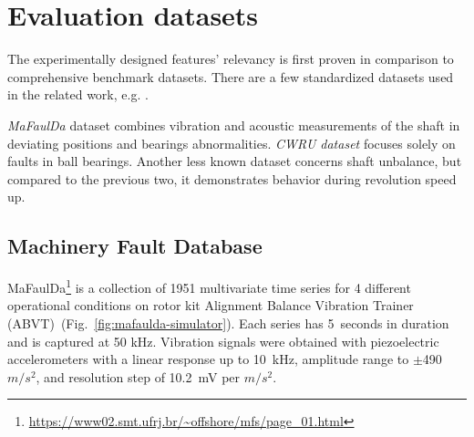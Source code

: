 \section{Evaluation datasets} \label{section:evaluation-datasets}
The experimentally designed features' relevancy is first proven in comparison to comprehensive benchmark datasets. There are a few standardized datasets used in the related work, e.g. \cite{ribeiro_rotating_2017}.

\emph{MaFaulDa} dataset combines vibration and acoustic measurements of the shaft in deviating positions and bearings abnormalities. \emph{CWRU dataset} focuses solely on faults in ball bearings. Another less known dataset concerns shaft unbalance, but compared to the previous two, it demonstrates behavior during revolution speed up.  

\subsection{Machinery Fault Database}
MaFaulDa\footnote{\url{https://www02.smt.ufrj.br/~offshore/mfs/page_01.html}} is a collection of 1951 multivariate time series for 4 different operational conditions on rotor kit Alignment Balance Vibration Trainer (ABVT)~(Fig.~\ref{fig:mafaulda-simulator}). Each series has 5~seconds in duration and is captured at 50 kHz. Vibration signals were obtained with piezoelectric accelerometers with a linear response up to 10~kHz, amplitude range to $\pm$490 $m/s^2$, and resolution step of 10.2~mV per $m/s^2$. 

